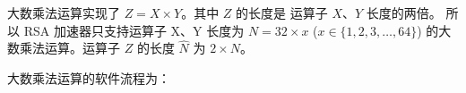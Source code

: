 \documentclass[main\_\_CN.tex]{subfiles}
\begin{document}
大数乘法运算实现了 \begin{math}Z = X \times Y\end{math}。其中 \begin{math}Z\end{math} 的长度是
运算子 \begin{math}X\end{math}、\begin{math}Y\end{math} 长度的两倍。
所以 RSA 加速器只支持运算子 X、Y 长度为 \begin{math}N = 32 \times x\end{math} (\begin{math}x \in \{ 1, 2, 3, \dots, 64\} \end{math}) 的大数乘法运算。运算子 \begin{math}Z\end{math} 的长度 \begin{math}\hat{N}\end{math} 为 \begin{math}2 \times N\end{math}。


大数乘法运算的软件流程为：
\end{document}
